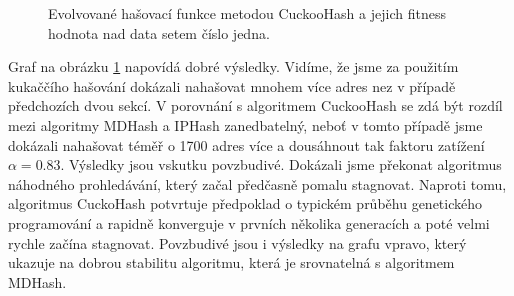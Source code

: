 \begin{figure}[!ht]
	\centering
	\caption{Evolvované hašovací funkce metodou CuckooHash a jejich fitness hodnota nad data setem číslo jedna.}
	\label{fig:cuckooComparison1}
\end{figure}

Graf na obrázku \ref{fig:cuckooComparison1} napovídá dobré výsledky. Vidíme, že jsme za použitím kukaččího hašování 
dokázali nahašovat mnohem více adres nez v případě předchozích dvou sekcí. V porovnání s algoritmem CuckooHash se zdá
být rozdíl mezi algoritmy MDHash a IPHash zanedbatelný, neboť v tomto případě jsme dokázali nahašovat téměř o 1700 adres
více a dousáhnout tak faktoru zatížení $\alpha = 0.83$. Výsledky jsou vskutku povzbudivé. Dokázali jsme překonat algoritmus
náhodného prohledávání, který začal předčasně 
pomalu stagnovat. Naproti tomu, algoritmus CuckoHash potvrtuje předpoklad o typickém průběhu genetického programování a 
rapidně konverguje v prvních několika generacích a poté velmi rychle začína stagnovat. Povzbudivé jsou i výsledky na grafu
vpravo, který ukazuje na dobrou stabilitu algoritmu, která je srovnatelná s algoritmem MDHash.

